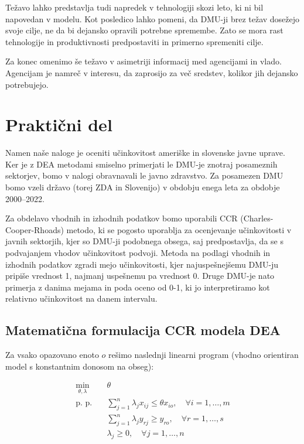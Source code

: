 \documentclass[12pt,a4paper]{article}
\theoremstyle{definition}
\begin{document}
Težavo lahko predstavlja tudi napredek v tehnologiji
skozi leto, ki ni bil napovedan v modelu. Kot posledico
lahko pomeni, da DMU-ji brez težav dosežejo svoje cilje,
ne da bi dejansko opravili potrebne spremembe. Zato se
mora rast tehnologije in produktivnosti predpostaviti 
in primerno spremeniti cilje.

Za konec omenimo še težavo v asimetriji informacij med
agencijami in vlado. Agencijam je namreč v interesu,
da zaprosijo za več sredstev, kolikor jih dejansko 
potrebujejo. 

\section{Praktični del}

Namen naše naloge je oceniti učinkovitost ameriške in slovenske
javne uprave. Ker je z DEA metodami smiselno
primerjati le DMU-je znotraj posameznih sektorjev, bomo v nalogi obravnavali le
javno zdravstvo. Za posamezen DMU bomo vzeli državo (torej ZDA in Slovenijo) v obdobju 
enega leta za obdobje 2000--2022.

Za obdelavo vhodnih in izhodnih podatkov bomo uporabili CCR 
(Charles-Cooper-Rhoads) metodo, ki se pogosto uporablja za 
ocenjevanje učinkovitosti v javnih sektorjih, kjer so DMU-ji podobnega obsega, saj 
predpostavlja, da se s podvajanjem vhodov učinkovitost podvoji. 
Metoda na podlagi vhodnih in izhodnih podatkov zgradi mejo učinkovitosti, kjer najuspešnejšemu DMU-ju pripiše vrednost 1,
najmanj uspešnemu pa vrednost 0. Druge DMU-je nato primerja z danima mejama in poda oceno od 0-1, ki jo
interpretiramo kot relativno učinkovitost na danem intervalu.

\subsection{Matematična formulacija CCR modela DEA}

Za vsako opazovano enoto \( o \) rešimo naslednji linearni program (vhodno orientiran model s konstantnim donosom na obseg):

\begin{align*}
\min_{\theta, \lambda} \quad & \theta \\
\text{p. p.} \quad 
& \sum_{j=1}^{n} \lambda_j x_{ij} \leq \theta x_{io}, \quad \forall i = 1, \dots, m \\
& \sum_{j=1}^{n} \lambda_j y_{rj} \geq y_{ro}, \quad \forall r = 1, \dots, s \\
& \lambda_j \geq 0, \quad \forall j = 1, \dots, n
\end{align*}
\end{document}
